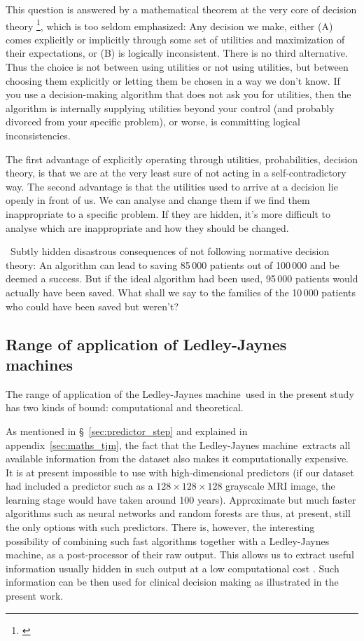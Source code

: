 \documentclass[utf8]{FrontiersinHarvard} %
\newcommand*{\pencil}{{\fontencoding{U}\fontfamily{fontawesometwo}\selectfont\symbol{210}}}
\newcommand{\mynotep}[1]{{\color{notecolour}\pencil\ #1}}
\newcommand*{\sect}{\S}%
\renewcommand*{\|}[1][]{\nonscript\:#1\vert\nonscript\:\mathopen{}}
\newcommand*{\ljm}{Ledley-Jaynes machine}
\begin{document}
This question is answered by a mathematical theorem at the very core of decision theory \footnote{\citet{savage1954_r1972,luceetal1957,raiffaetal1961_r2000,atkinsonetal1964,ferguson1967,lindley1971_r1988,kreps1988,bernardoetal1994_r2000,prattetal1995_r1996,lindley2006_r2014,pettigrew2011_r2019}}, which is too seldom emphasized: Any decision we make, either (A) comes explicitly or implicitly through some set of utilities and maximization of their expectations, or (B) is logically inconsistent. There is no third alternative. Thus the choice is not between using utilities or not using utilities, but between choosing them explicitly or letting them be chosen in a way we don't know. If you use a decision-making algorithm that does not ask you for utilities, then the algorithm is internally supplying utilities beyond your control (and probably divorced from your specific problem), or worse, is committing logical inconsistencies.

The first advantage of explicitly operating through utilities, probabilities, decision theory, is that we are at the very least sure of not acting in a self-contradictory way. The second advantage is that the utilities used to arrive at a decision lie openly in front of us. We can analyse and change them if we find them inappropriate to a specific problem. If they are hidden, it's more difficult to analyse which are inappropriate and how they should be changed.

\mynotep{Subtly hidden disastrous consequences of not following normative decision theory: An algorithm can lead to saving 85\,000 patients out of 100\,000 and be deemed a success. But if the ideal algorithm had been used, 95\,000 patients would actually have been saved. What shall we say to the families of the 10\,000 patients who could have been saved but weren't?}

\subsection{Range of application of \ljm s}
\label{sec:rangeLJM}

The range of application of the \ljm\ used in the present study has two kinds of bound: computational and theoretical.

As mentioned in \sect~\ref{sec:predictor_step} and explained in appendix~\ref{sec:maths_tjm}, the fact that the \ljm\ extracts all available information from the dataset also makes it computationally expensive. It is at present impossible to use with high-dimensional predictors (if our dataset had included a predictor such as a $128\times128\times128$ grayscale MRI image, the learning stage would have taken around 100 years). Approximate but much faster algorithms such as neural networks and random forests are thus, at present, still the only options with such predictors. There is, however, the interesting possibility of combining such fast algorithms together with a \ljm, as a post-processor of their raw output. This allows us to extract useful information usually hidden in such output at a low computational cost \citep{dyrlandetal2022b}. Such information can be then used for clinical decision making as illustrated in the present work.
\end{document}
